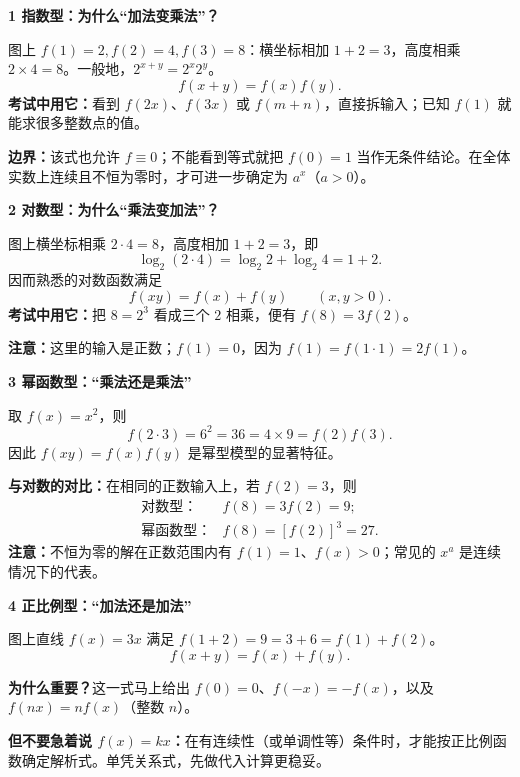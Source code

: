 \FReserve{7.5cm}
\begin{explanationbox}
\textbf{\textcolor{CExplanation}{1 指数型：为什么“加法变乘法”？}}


图上 $f(1)=2,f(2)=4,f(3)=8$：横坐标相加 $1+2=3$，高度相乘 $2\times4=8$。一般地，$2^{x+y}=2^x2^y$。
\[
\boxed{f(x+y)=f(x)f(y)}.
\]
\textbf{考试中用它：}看到 $f(2x)$、$f(3x)$ 或 $f(m+n)$，直接拆输入；已知 $f(1)$ 就能求很多整数点的值。

\textbf{边界：}该式也允许 $f\equiv0$；不能看到等式就把 $f(0)=1$ 当作无条件结论。在全体实数上连续且不恒为零时，才可进一步确定为 $a^x$（$a>0$）。
\end{explanationbox}

\FReserve{7.5cm}
\begin{explanationbox}
\textbf{\textcolor{CExplanation}{2 对数型：为什么“乘法变加法”？}}


图上横坐标相乘 $2\cdot4=8$，高度相加 $1+2=3$，即
\[
\log_2(2\cdot4)=\log_2 2+\log_2 4=1+2.
\]
因而熟悉的对数函数满足
\[\boxed{f(xy)=f(x)+f(y)}\qquad(x,y>0).\]
\textbf{考试中用它：}把 $8=2^3$ 看成三个 $2$ 相乘，便有 $f(8)=3f(2)$。

\textbf{注意：}这里的输入是正数；$f(1)=0$，因为 $f(1)=f(1\cdot1)=2f(1)$。
\end{explanationbox}

\FReserve{7.5cm}
\begin{explanationbox}
\textbf{\textcolor{CExplanation}{3 幂函数型：“乘法还是乘法”}}


取 $f(x)=x^2$，则
\[
 f(2\cdot3)=6^2=36=4\times9=f(2)f(3).
\]
因此 $\boxed{f(xy)=f(x)f(y)}$ 是幂型模型的显著特征。

\textbf{与对数的对比：}在相同的正数输入上，若 $f(2)=3$，则
\[
\begin{array}{ll}
\text{对数型：}&f(8)=3f(2)=9;\\
\text{幂函数型：}&f(8)=[f(2)]^3=27.
\end{array}
\]
\textbf{注意：}不恒为零的解在正数范围内有 $f(1)=1$、$f(x)>0$；常见的 $x^a$ 是连续情况下的代表。
\end{explanationbox}

\FReserve{7.5cm}
\begin{explanationbox}
\textbf{\textcolor{CExplanation}{4 正比例型：“加法还是加法”}}


图上直线 $f(x)=3x$ 满足 $f(1+2)=9=3+6=f(1)+f(2)$。
\[\boxed{f(x+y)=f(x)+f(y)}.\]

\textbf{为什么重要？}这一式马上给出 $f(0)=0$、$f(-x)=-f(x)$，以及 $f(nx)=nf(x)$（整数 $n$）。

\textbf{但不要急着说 $f(x)=kx$：}在有连续性（或单调性等）条件时，才能按正比例函数确定解析式。单凭关系式，先做代入计算更稳妥。
\end{explanationbox}

